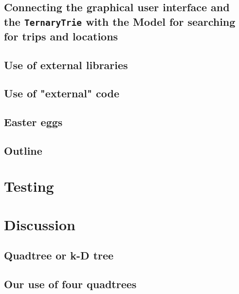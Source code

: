 \documentclass[a4paper,11pt]{article}
\begin{document}
\subsection{Connecting the graphical user interface and the \texttt{TernaryTrie} with the Model for searching for trips and locations}


\subsection{Use of external libraries}


\subsection{Use of "external" code}


\subsection{Easter eggs}
\label{sec:Imp, Easter eggs}


\subsection{Outline}


\pagebreak
\section{Testing}
\label{sec:Testing}


\pagebreak
\section{Discussion}
\label{sec:Discussion}

\subsection{Quadtree or k-D tree}


\subsection{Our use of four quadtrees}

\end{document}
